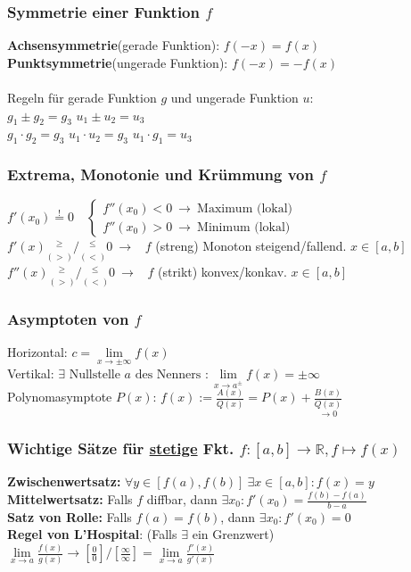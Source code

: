 \documentclass[6pt,a4paper]{scrartcl}
\newcommand{\ra}[0]{\ensuremath{\rightarrow}}
\begin{document}
\begin{multicols}{4}
\subsubsection{Symmetrie einer Funktion $f$}
\textbf{Achsensymmetrie}(gerade Funktion): $f(-x)=f(x)$\\
\textbf{Punktsymmetrie}(ungerade Funktion): $f(-x)=-f(x)$\\
\\
Regeln für gerade Funktion $g$ und ungerade Funktion $u$:\\
$g_1 \pm g_2 = g_3$ \qquad $u_1 \pm u_2 = u_3$\\
$g_1 \cdot g_2=g_3$ \qquad $u_1 \cdot u_2 = g_3$ \qquad $u_1 \cdot g_1=u_3$

\subsubsection{Extrema, Monotonie und Krümmung von $f$}
$f'(x_0)\overset{!}{=}0 \quad \begin{cases}f''(x_0)<0 \ \rightarrow \ \text{Maximum (lokal)} \\ f''(x_0)>0 \ \rightarrow \ \text{Minimum (lokal)}\end{cases} $\\
$f'(x) \underset{(>)}{^{\ge}} / \underset{(<)}{^{\le}} 0 \ \rightarrow$ \ $f$ (streng) Monoton steigend/fallend. $x\in[a,b]$\\
$f''(x) \underset{(>)}{^{\ge}} / \underset{(<)}{^{\le}} 0 \ \rightarrow$ \ $f$ (strikt) konvex/konkav. $x\in[a,b]$\\

\subsubsection{Asymptoten von $f$}
Horizontal: $c=\lim\limits_{x\ra \pm \infty} f(x)$\\
Vertikal: $\exists \text{ Nullstelle } a \text{ des Nenners }: \lim\limits_{x \rightarrow a^{\pm}} f(x) = \pm \infty$\\
Polynomasymptote $P(x)$: $f(x):=\frac{A(x)}{Q(x)}=P(x)+ \underset{\ra 0}{\frac{B(x)}{Q(x)}}$


\subsubsection{Wichtige Sätze für \underline{stetige} Fkt. $f: [a,b] \rightarrow \mathbb R, f \mapsto f(x)$ }
\textbf{Zwischenwertsatz:} $\forall y \in [f(a),f(b)]\ \exists x\in [a,b]:f(x)=y$\\
\textbf{Mittelwertsatz:} Falls $f$ diffbar, dann $\exists x_0:f'(x_0)=\frac{f(b)-f(a)}{b-a}$\\
\textbf{Satz von Rolle:} Falls $f(a)=f(b)$, dann $\exists x_0: f' (x_0) = 0$\\
\textbf{Regel von L'Hospital}: (Falls $\exists$ ein Grenzwert) \\ $\lim\limits_{x \rightarrow a} \frac{f(x)}{g(x)} \rightarrow \left[ \frac{0}{0} \right] / \left[ \frac{\infty}{\infty} \right] = \lim\limits_{x \rightarrow a} \frac{f'(x)}{g'(x)}$


\end{multicols}
\end{document}
